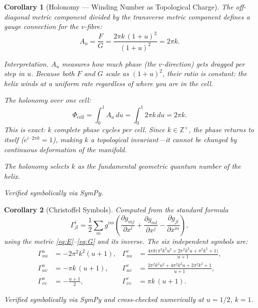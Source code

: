 \documentclass[12pt]{amsart}
\newtheorem{corollary}{Corollary}
\begin{document}
\begin{corollary}[Holonomy --- Winding Number as Topological Charge]
The off-diagonal metric component divided by the transverse metric component defines a gauge
connection for the $v$-fibre:
\[
  A_u = \frac{F}{G} = \frac{2\pi k\,(1+u)^2}{(1+u)^2} = 2\pi k.
\]

\textit{Interpretation.} $A_u$ measures how much phase (the $v$-direction) gets dragged per
step in $u$. Because both $F$ and $G$ scale as $(1+u)^2$, their ratio is constant: the helix
winds at a uniform rate regardless of where you are in the cell.

The holonomy over one cell:
\[
  \Phi_{\mathrm{cell}} = \int_0^1 A_u\, du = \int_0^1 2\pi k\, du = 2\pi k.
\]
This is exact: $k$ complete phase cycles per cell. Since $k \in \mathbb{Z}^+$, the phase
returns to itself ($e^{i \cdot 2\pi k} = 1$), making $k$ a topological invariant---it cannot be
changed by continuous deformation of the manifold.

The holonomy selects $k$ as the fundamental geometric quantum number of the helix.

Verified symbolically via SymPy.
\end{corollary}

\begin{corollary}[Christoffel Symbols]
Computed from the standard formula
\[
  \Gamma^i_{jl} = \frac{1}{2} \sum_m g^{im}
    \left(\frac{\partial g_{mj}}{\partial x^l}
    + \frac{\partial g_{ml}}{\partial x^j}
    - \frac{\partial g_{jl}}{\partial x^m}\right),
\]
using the metric \eqref{eq:E}--\eqref{eq:G} and its inverse. The six independent symbols are:
\begin{align}
  \Gamma^u_{uu} &= -2\pi^2 k^2(u+1), &
  \Gamma^v_{uu} &= \frac{4\pi k\bigl(\pi^2 k^2 u^2 + 2\pi^2 k^2 u + \pi^2 k^2 + 1\bigr)}{u+1},
    \label{eq:chris1} \\
  \Gamma^u_{uv} &= -\pi k\,(u+1), &
  \Gamma^v_{uv} &= \frac{2\pi^2 k^2 u^2 + 4\pi^2 k^2 u + 2\pi^2 k^2 + 1}{u+1},
    \label{eq:chris2} \\
  \Gamma^u_{vv} &= -\frac{u+1}{2}, &
  \Gamma^v_{vv} &= \pi k\,(u+1). \label{eq:chris3}
\end{align}

Verified symbolically via SymPy and cross-checked numerically at $u = 1/2$, $k = 1$.
\end{corollary}
\end{document}
